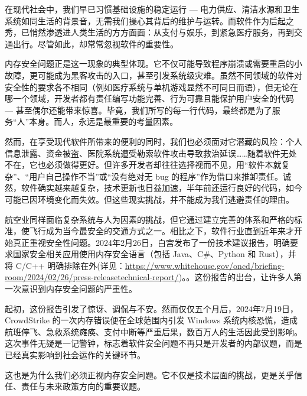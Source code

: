 在现代社会中，我们早已习惯基础设施的稳定运行 --- 电力供应、清洁水源和卫生系统如同生活的背景音，无需我们操心其背后的维护与运转。而软件作为后起之秀，已悄然渗透进人类生活的方方面面：从支付与娱乐，到紧急医疗服务，再到交通出行。尽管如此，却常常忽视软件的重要性。

内存安全问题正是这一现象的典型体现。它不仅可能导致程序崩溃或需要重启的小故障，更可能成为黑客攻击的入口，甚至引发系统级灾难。虽然不同领域的软件对安全性的要求各不相同（例如医疗系统与单机游戏显然不可同日而语），但无论在哪一个领域，开发者都有责任编写功能完善、行为可靠且能保护用户安全的代码 --- 甚至偶尔还能带来惊喜。毕竟，我们所写的每一行代码，最终都是为了服务“人”本身。而人，永远是最重要的考量因素。

然而，在享受现代软件所带来的便利的同时，我们也必须面对它潜藏的风险：个人信息泄露、资金被盗、医院系统遭受勒索软件攻击导致救治延误……随着软件无处不在，它也必须做得更好。但许多开发者却往往选择视而不见，用“软件本就复杂”、“用户自己操作不当”或“没有绝对无 bug 的程序”作为借口来推卸责任。诚然，软件确实越来越复杂，技术更新也日益加速，半年前还运行良好的代码，如今可能已因环境变化而失效。但这些现实挑战，并不能成为我们逃避责任的理由。

航空业同样面临复杂系统与人为因素的挑战，但它通过建立完善的体系和严格的标准，使飞行成为当今最安全的交通方式之一。相比之下，软件行业直到近年来才开始真正重视安全性问题。2024年2月26日，白宫发布了一份技术建议报告，明确要求国家安全相关应用使用内存安全语言（包括 Java、C\#、Python 和 Rust），并将 C/C++ 明确排除在外(详见：\url{https://www.whitehouse.gov/oncd/briefing-room/2024/02/26/press-releasetechnical-report/})。。这份报告的出台，让许多人第一次意识到内存安全问题的严重性。

起初，这份报告引发了惊讶、调侃与不安。然而仅仅五个月后，2024年7月19日，CrowdStrike 的一次内存错误便在全球范围内引发 Windows 系统内核恐慌，造成航班停飞、急救系统瘫痪、支付中断等严重后果，数百万人的生活因此受到影响。这次事件无疑是一记警钟，标志着软件安全问题不再只是开发者的内部议题，而是已经真实影响到社会运作的关键环节。

这也是为什么我们必须正视内存安全问题。它不仅是技术层面的挑战，更是关乎信任、责任与未来政策方向的重要议题。
